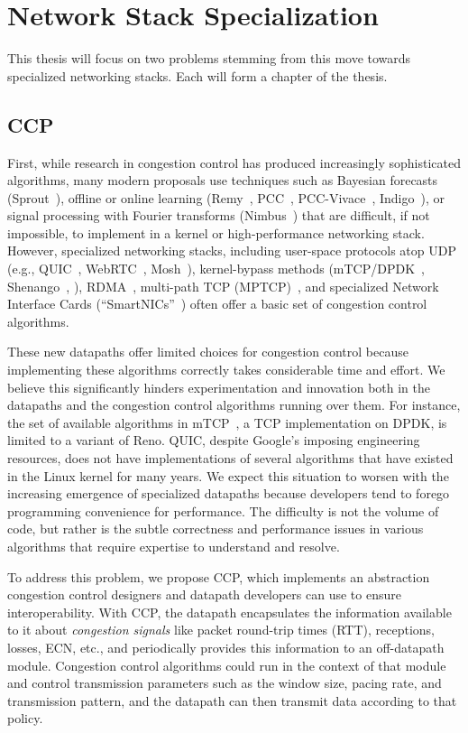 \documentclass[fontsize=12pt,paper=letter]{scrartcl}
\begin{document}
\section{Network Stack Specialization}\label{s:specialization}

This thesis will focus on two problems stemming from this move towards specialized networking stacks. Each will form a chapter of the thesis.

\subsection{CCP}
First, while research in congestion control has produced increasingly sophisticated algorithms, many modern proposals use techniques such as Bayesian forecasts (Sprout~\cite{sprout}), offline or online learning (Remy~\cite{remy}, PCC~\cite{pcc}, PCC-Vivace~\cite{pcc-vivace}, Indigo~\cite{pantheon}), or signal processing with Fourier transforms (Nimbus~\cite{nimbus}) that are difficult, if not impossible, to implement in a kernel or high-performance networking stack.
However, specialized networking stacks, including user-space protocols atop UDP (e.g., QUIC~\cite{quic, mvfst}, WebRTC~\cite{webrtc}, Mosh~\cite{mosh}), kernel-bypass methods (\eg mTCP/DPDK~\cite{dpdk,mtcp,netmap}, Shenango~\cite{shenango}, \etc), RDMA~\cite{dcqcn}, multi-path TCP (MPTCP)~\cite{mptcp}, and specialized Network Interface Cards (``SmartNICs''~\cite{smartnic}) often offer a basic set of congestion control algorithms.

These new datapaths offer limited choices for congestion control because implementing these algorithms correctly takes considerable time and effort. 
We believe this significantly hinders experimentation and innovation both in the datapaths and the congestion control algorithms running over them.
For instance, the set of available algorithms in mTCP~\cite{mtcp}, a TCP implementation on DPDK, is limited to a variant of Reno. 
QUIC, despite Google's imposing engineering resources, does not have implementations of several algorithms that have existed in the Linux kernel for many years.  
We expect this situation to worsen with the increasing emergence of specialized datapaths because developers tend to forego programming convenience for performance. 
The difficulty is not the volume of code, but rather is the subtle correctness and performance issues in various algorithms that require expertise to understand and resolve.

To address this problem, we propose CCP, which implements an abstraction congestion control designers and datapath developers can use to ensure interoperability. 
With CCP,  the datapath encapsulates the information available to it about {\em congestion signals} like packet round-trip times (RTT), receptions, losses, ECN, etc., and periodically provides this information to an off-datapath module. Congestion control algorithms could run in the context of that module and control transmission parameters such as the window size, pacing rate, and transmission pattern, and the datapath can then transmit data according to that policy. 
\end{document}
